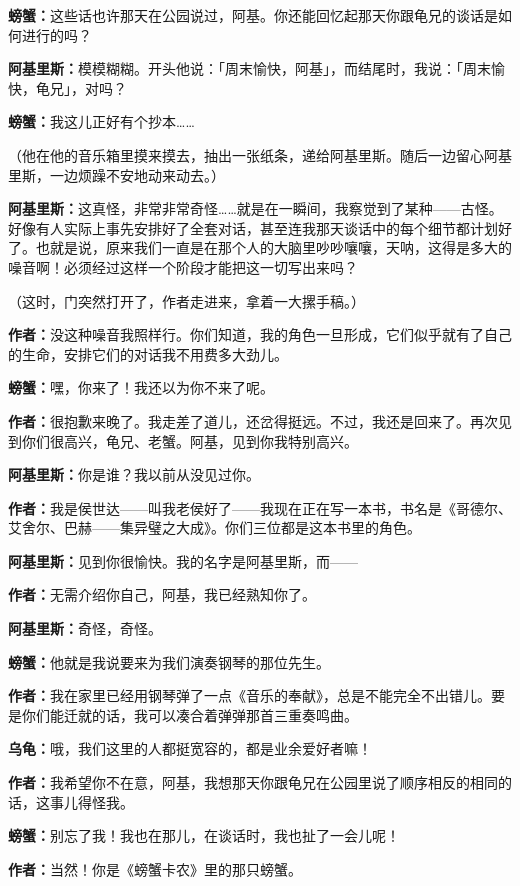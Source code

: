 \documentclass[
  12pt,
  twoside,
  openright,
  oldfontcommands,
]{memoir}
\newcommand{\dialogname}[1]{{\heifamily\bfseries #1}}
\begin{document}
\dialogname{螃蟹：}这些话也许那天在公园说过，阿基。你还能回忆起那天你跟龟兄的谈话是如何进行的吗？

\dialogname{阿基里斯：}模模糊糊。开头他说：「周末愉快，阿基」，而结尾时，我说：「周末愉快，龟兄」，对吗？

\dialogname{螃蟹：}我这儿正好有个抄本\ldots\ldots{}

（他在他的音乐箱里摸来摸去，抽出一张纸条，递给阿基里斯。随后一边留心阿基里斯，一边烦躁不安地动来动去。）

\dialogname{阿基里斯：}这真怪，非常非常奇怪\ldots\ldots 就是在一瞬间，我察觉到了某种------古怪。好像有人实际上事先安排好了全套对话，甚至连我那天谈话中的每个细节都计划好了。也就是说，原来我们一直是在那个人的大脑里吵吵嚷嚷，天呐，这得是多大的噪音啊！必须经过这样一个阶段才能把这一切写出来吗？

（这时，门突然打开了，作者走进来，拿着一大摞手稿。）

\dialogname{作者：}没这种噪音我照样行。你们知道，我的角色一旦形成，它们似乎就有了自己的生命，安排它们的对话我不用费多大劲儿。

\dialogname{螃蟹：}嘿，你来了！我还以为你不来了呢。

\dialogname{作者：}很抱歉来晚了。我走差了道儿，还岔得挺远。不过，我还是回来了。再次见到你们很高兴，龟兄、老蟹。阿基，见到你我特别高兴。

\dialogname{阿基里斯：}你是谁？我以前从没见过你。

\dialogname{作者：}我是侯世达------叫我老侯好了------我现在正在写一本书，书名是《哥德尔、艾舍尔、巴赫------集异璧之大成》。你们三位都是这本书里的角色。

\dialogname{阿基里斯：}见到你很愉快。我的名字是阿基里斯，而------

\dialogname{作者：}无需介绍你自己，阿基，我已经熟知你了。

\dialogname{阿基里斯：}奇怪，奇怪。

\dialogname{螃蟹：}他就是我说要来为我们演奏钢琴的那位先生。

\dialogname{作者：}我在家里已经用钢琴弹了一点《音乐的奉献》，总是不能完全不出错儿。要是你们能迁就的话，我可以凑合着弹弹那首三重奏鸣曲。

\dialogname{乌龟：}哦，我们这里的人都挺宽容的，都是业余爱好者嘛！

\dialogname{作者：}我希望你不在意，阿基，我想那天你跟龟兄在公园里说了顺序相反的相同的话，这事儿得怪我。

\dialogname{螃蟹：}别忘了我！我也在那儿，在谈话时，我也扯了一会儿呢！

\dialogname{作者：}当然！你是《螃蟹卡农》里的那只螃蟹。
\end{document}
